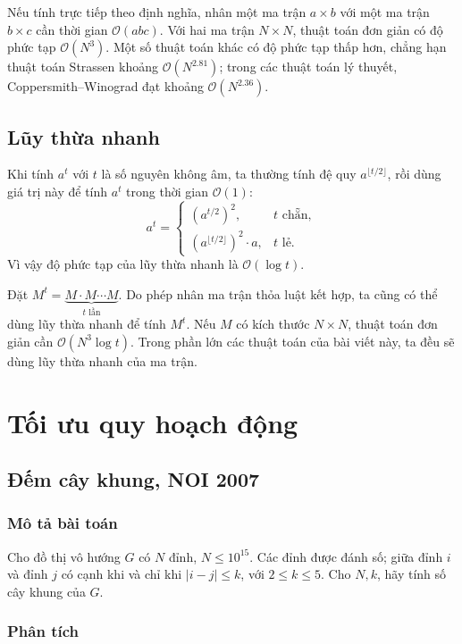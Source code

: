 \documentclass[11pt]{article}
\newcommand{\Oh}{\mathcal{O}}
\begin{document}
Nếu tính trực tiếp theo định nghĩa, nhân một ma trận \(a\times b\) với một ma
trận \(b\times c\) cần thời gian \(\Oh(abc)\). Với hai ma trận \(N\times N\),
thuật toán đơn giản có độ phức tạp \(\Oh(N^3)\). Một số thuật toán khác có
độ phức tạp thấp hơn, chẳng hạn thuật toán Strassen khoảng \(\Oh(N^{2.81})\);
trong các thuật toán lý thuyết, Coppersmith--Winograd đạt khoảng
\(\Oh(N^{2.36})\).

\subsection{Lũy thừa nhanh}

Khi tính \(a^t\) với \(t\) là số nguyên không âm, ta thường tính đệ quy
\(a^{\lfloor t/2\rfloor}\), rồi dùng giá trị này để tính \(a^t\) trong thời
gian \(\Oh(1)\):
\[
  a^t=
  \begin{cases}
    \left(a^{t/2}\right)^2, & t\text{ chẵn},\\
    \left(a^{\lfloor t/2\rfloor}\right)^2\cdot a, & t\text{ lẻ}.
  \end{cases}
\]
Vì vậy độ phức tạp của lũy thừa nhanh là \(\Oh(\log t)\).

Đặt \(M^t=\underbrace{M\cdot M\cdots M}_{t\text{ lần}}\). Do phép nhân ma
trận thỏa luật kết hợp, ta cũng có thể dùng lũy thừa nhanh để tính \(M^t\).
Nếu \(M\) có kích thước \(N\times N\), thuật toán đơn giản cần
\(\Oh(N^3\log t)\). Trong phần lớn các thuật toán của bài viết này, ta đều sẽ
dùng lũy thừa nhanh của ma trận.

\section{Tối ưu quy hoạch động}

\subsection{Đếm cây khung, NOI 2007}

\subsubsection{Mô tả bài toán}

Cho đồ thị vô hướng \(G\) có \(N\) đỉnh, \(N\le 10^{15}\). Các đỉnh được đánh
số; giữa đỉnh \(i\) và đỉnh \(j\) có cạnh khi và chỉ khi \(|i-j|\le k\), với
\(2\le k\le 5\). Cho \(N,k\), hãy tính số cây khung của \(G\).

\subsubsection{Phân tích}
\end{document}
